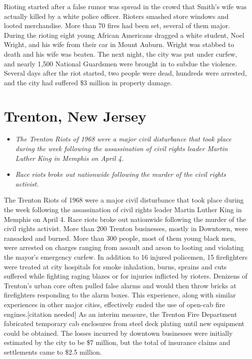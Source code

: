 Rioting started after a false rumor was spread in the crowd that Smith's
wife was actually killed by a white police officer. Rioters smashed
store windows and looted merchandise. More than 70 fires had been set,
several of them major. During the rioting eight young African Americans
dragged a white student, Noel Wright, and his wife from their car in
Mount Auburn. Wright was stabbed to death and his wife was beaten. The
next night, the city was put under curfew, and nearly 1,500 National
Guardsmen were brought in to subdue the violence. Several days after the
riot started, two people were dead, hundreds were arrested, and the city
had suffered \$3 million in property damage.

\section{Trenton, New Jersey}\label{trenton-new-jersey}

\begin{itemize}
\item
  \emph{The Trenton Riots of 1968 were a major civil disturbance that
  took place during the week following the assassination of civil rights
  leader Martin Luther King in Memphis on April 4.}
\item
  \emph{Race riots broke out nationwide following the murder of the
  civil rights activist.}
\end{itemize}

The Trenton Riots of 1968 were a major civil disturbance that took place
during the week following the assassination of civil rights leader
Martin Luther King in Memphis on April 4. Race riots broke out
nationwide following the murder of the civil rights activist. More than
200 Trenton businesses, mostly in Downtown, were ransacked and burned.
More than 300 people, most of them young black men, were arrested on
charges ranging from assault and arson to looting and violating the
mayor's emergency curfew. In addition to 16 injured policemen, 15
firefighters were treated at city hospitals for smoke inhalation, burns,
sprains and cuts suffered while fighting raging blazes or for injuries
inflicted by rioters. Denizens of Trenton's urban core often pulled
false alarms and would then throw bricks at firefighters responding to
the alarm boxes. This experience, along with similar experiences in
other major cities, effectively ended the use of open-cab fire
engines.{[}citation needed{]} As an interim measure, the Trenton Fire
Department fabricated temporary cab enclosures from steel deck plating
until new equipment could be obtained. The losses incurred by downtown
businesses were initially estimated by the city to be \$7 million, but
the total of insurance claims and settlements came to \$2.5 million.

